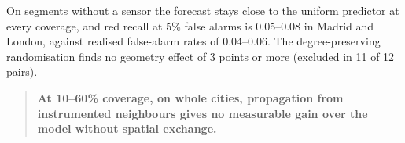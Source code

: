 On segments without a sensor the forecast stays close to the uniform predictor at every coverage, and red recall at 5\% false alarms is 0.05–0.08 in Madrid and London, against realised false-alarm rates of 0.04–0.06. The degree-preserving randomisation finds no geometry effect of 3 points or more (excluded in 11 of 12 pairs).

\begin{quote}
\textbf{At 10–60\% coverage, on whole cities, propagation from instrumented neighbours gives no measurable gain over the model without spatial exchange.}
\end{quote}

